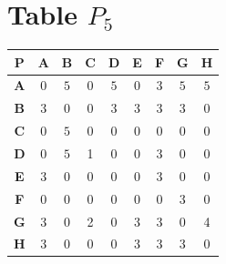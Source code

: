 \documentclass{article}
\begin{document}
\section{Table $P_{5}$}
\begin{center}
    \begin{tabular}{|c||c|c|c|c|c|c|c|c|}
        \hline
        \textbf{P} & \textbf{A} & \textbf{B} & \textbf{C} & \textbf{D} & \textbf{E} & \textbf{F} & \textbf{G} & \textbf{H} \\
        \hline
        \hline
        \textbf{A}& 0 & \cellcolor[HTML]{D74894}$5$ & 0 & \cellcolor[HTML]{D74894}$5$ & 0 & 3 & \cellcolor[HTML]{D74894}$5$ & \cellcolor[HTML]{D74894}$5$ \\
        \hline
        \textbf{B}& 3 & 0 & 0 & 3 & 3 & 3 & 3 & 0 \\
        \hline
        \textbf{C}& 0 & \cellcolor[HTML]{D74894}$5$ & 0 & 0 & 0 & 0 & 0 & 0 \\
        \hline
        \textbf{D}& 0 & \cellcolor[HTML]{D74894}$5$ & 1 & 0 & 0 & 3 & 0 & 0 \\
        \hline
        \textbf{E}& 3 & 0 & 0 & 0 & 0 & 3 & 0 & 0 \\
        \hline
        \textbf{F}& 0 & 0 & 0 & 0 & 0 & 0 & 3 & 0 \\
        \hline
        \textbf{G}& 3 & 0 & 2 & 0 & 3 & 3 & 0 & 4 \\
        \hline
        \textbf{H}& 3 & 0 & 0 & 0 & 3 & 3 & 3 & 0 \\
        \hline
    \end{tabular}
\end{center}
\end{document}
